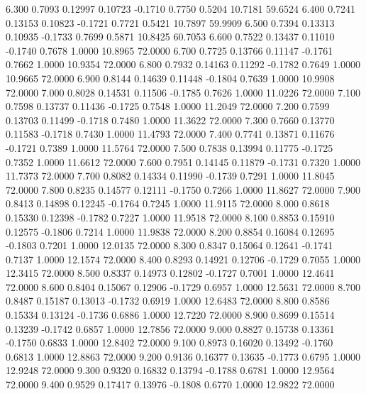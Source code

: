    6.300   0.7093   0.12997   0.10723  -0.1710   0.7750   0.5204  10.7181  59.6524
   6.400   0.7241   0.13153   0.10823  -0.1721   0.7721   0.5421  10.7897  59.9909
   6.500   0.7394   0.13313   0.10935  -0.1733   0.7699   0.5871  10.8425  60.7053
   6.600   0.7522   0.13437   0.11010  -0.1740   0.7678   1.0000  10.8965  72.0000
   6.700   0.7725   0.13766   0.11147  -0.1761   0.7662   1.0000  10.9354  72.0000
   6.800   0.7932   0.14163   0.11292  -0.1782   0.7649   1.0000  10.9665  72.0000
   6.900   0.8144   0.14639   0.11448  -0.1804   0.7639   1.0000  10.9908  72.0000
   7.000   0.8028   0.14531   0.11506  -0.1785   0.7626   1.0000  11.0226  72.0000
   7.100   0.7598   0.13737   0.11436  -0.1725   0.7548   1.0000  11.2049  72.0000
   7.200   0.7599   0.13703   0.11499  -0.1718   0.7480   1.0000  11.3622  72.0000
   7.300   0.7660   0.13770   0.11583  -0.1718   0.7430   1.0000  11.4793  72.0000
   7.400   0.7741   0.13871   0.11676  -0.1721   0.7389   1.0000  11.5764  72.0000
   7.500   0.7838   0.13994   0.11775  -0.1725   0.7352   1.0000  11.6612  72.0000
   7.600   0.7951   0.14145   0.11879  -0.1731   0.7320   1.0000  11.7373  72.0000
   7.700   0.8082   0.14334   0.11990  -0.1739   0.7291   1.0000  11.8045  72.0000
   7.800   0.8235   0.14577   0.12111  -0.1750   0.7266   1.0000  11.8627  72.0000
   7.900   0.8413   0.14898   0.12245  -0.1764   0.7245   1.0000  11.9115  72.0000
   8.000   0.8618   0.15330   0.12398  -0.1782   0.7227   1.0000  11.9518  72.0000
   8.100   0.8853   0.15910   0.12575  -0.1806   0.7214   1.0000  11.9838  72.0000
   8.200   0.8854   0.16084   0.12695  -0.1803   0.7201   1.0000  12.0135  72.0000
   8.300   0.8347   0.15064   0.12641  -0.1741   0.7137   1.0000  12.1574  72.0000
   8.400   0.8293   0.14921   0.12706  -0.1729   0.7055   1.0000  12.3415  72.0000
   8.500   0.8337   0.14973   0.12802  -0.1727   0.7001   1.0000  12.4641  72.0000
   8.600   0.8404   0.15067   0.12906  -0.1729   0.6957   1.0000  12.5631  72.0000
   8.700   0.8487   0.15187   0.13013  -0.1732   0.6919   1.0000  12.6483  72.0000
   8.800   0.8586   0.15334   0.13124  -0.1736   0.6886   1.0000  12.7220  72.0000
   8.900   0.8699   0.15514   0.13239  -0.1742   0.6857   1.0000  12.7856  72.0000
   9.000   0.8827   0.15738   0.13361  -0.1750   0.6833   1.0000  12.8402  72.0000
   9.100   0.8973   0.16020   0.13492  -0.1760   0.6813   1.0000  12.8863  72.0000
   9.200   0.9136   0.16377   0.13635  -0.1773   0.6795   1.0000  12.9248  72.0000
   9.300   0.9320   0.16832   0.13794  -0.1788   0.6781   1.0000  12.9564  72.0000
   9.400   0.9529   0.17417   0.13976  -0.1808   0.6770   1.0000  12.9822  72.0000
